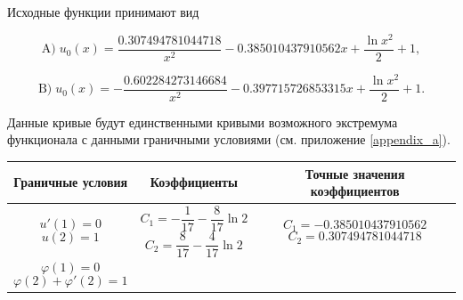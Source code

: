 \noindent Исходные функции принимают вид

\begin{displaymath}
	\text{A)} \; u_{0}(x) = \frac{0.307494781044718}{x^2} - 0.385010437910562 x + \frac{\ln{x^2}}{2} + 1,
\end{displaymath}

\begin{displaymath}
	\text{B)} \; u_{0}(x) = - \frac{0.602284273146684}{x^2} - 0.397715726853315 x + \frac{\ln{x^2}}{2} + 1.
\end{displaymath}

Данные кривые будут единственными кривыми возможного экстремума функционала с данными граничными условиями (см. приложение \ref{appendix_a}). 

\begin{table}[!h]
	\centering
	\begin{tabular}{|c|c|c|}
		\hline
		Граничные условия &
		Коэффициенты & 
		Точные значения коэффициентов \\
		\hline \hline
	
	\parbox[c]{3cm}{
		\begin{displaymath}
			u'(1) = 0
		\end{displaymath}
		\begin{displaymath}
			u(2) = 1
		\end{displaymath}
	} &
	
	\parbox[c]{3cm}{
		 \begin{displaymath}
			 C_{1} = - \frac{1}{17} - \frac{8}{17} \ln{2}
		 \end{displaymath}
		\begin{displaymath} 	
			 C_{2} = \frac{8}{17} - \frac{4}{17} \ln{2}
		 \end{displaymath}
		 } & 
		 
	\parbox[c]{4.07cm}{
		 \begin{displaymath}
			 C_{1} = -0.385010437910562 
		 \end{displaymath}
		 \begin{displaymath}
			 C_{2} = 0.307494781044718
		 \end{displaymath}
		 }\\	\hline
		
	\parbox[c]{3cm}{
		\begin{displaymath}
			\varphi(1) = 0
		\end{displaymath}
		\begin{displaymath}
			\varphi(2) + \varphi'(2) = 1
		\end{displaymath}
		} &
	

\end{tabular}
\end{table}
